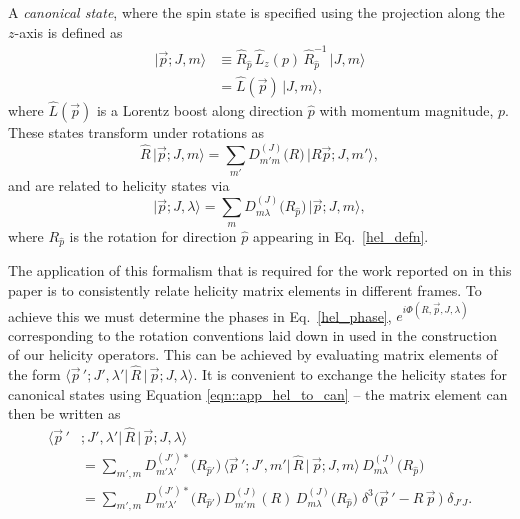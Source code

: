 \documentclass[twocolumn,amsmath,amssymb,prd,10pt,floatfix, 
superscriptaddress,nofootinbib, showpacs, preprintnumbers]{revtex4-1}
\begin{document}
A \emph{canonical state}, where the spin state is specified using the projection along the $z$-axis is defined as 
\begin{align*}
\big| \vec{p}; J,m \big\rangle &\equiv \hat{R}_{\hat{p}}\,  \hat{L}_z(p)\,  \hat{R}_{\hat{p}}^{-1}\, \big| J,m \big\rangle \\
&=  \hat{L}(\vec{p}) \, \big| J,m \big\rangle, 
\end{align*}
where $ \hat{L}(\vec{p})$ is a Lorentz boost along direction $\hat{p}$ with momentum magnitude, $p$. These states transform under rotations as 
\begin{equation*}
\hat{R} \,\big| \vec{p}; J,m \big\rangle = \sum_{m'} D^{(J)}_{m'm}\big(R\big) \, \big| R\vec{p}; J,m' \big\rangle,
\end{equation*}
and are related to helicity states via
\begin{equation}
\big| \vec{p}; J,\lambda \big\rangle  = \sum_{m} D^{(J)}_{m\lambda}\big(R_{\hat{p}}\big) \, \big| \vec{p}; J,m \big\rangle, \label{eqn::app_hel_to_can}
\end{equation}
where $R_{\hat{p}}$ is the rotation for direction $\hat{p}$ appearing in Eq.~\ref{hel_defn}. 



The application of this formalism that is required for the work reported on in this paper is to consistently relate helicity matrix elements in different frames. To achieve this we must determine the phases in Eq.~\ref{hel_phase}, $e^{i \Phi(R, \vec{p}, J, \lambda)}$ corresponding to the rotation conventions laid down in \cite{Thomas:2011rh} used in the construction of our helicity operators. This can be achieved by evaluating matrix elements of the form $\big\langle \vec{p}\,'; J', \lambda' \big| \, \hat{R} \, \big|\,\vec{p}; J,\lambda \big\rangle $. It is convenient to exchange the helicity states for canonical states using Equation \ref{eqn::app_hel_to_can} -- the matrix element can then be written as 
\begin{align*}
\big\langle \vec{p}\,'&; J', \lambda' \big| \, \hat{R} \, \big|\,\vec{p}; J,\lambda \big\rangle  \\ 
&= \sum_{m',m}\! D^{(J')*}_{m' \lambda'}\big(R_{\hat{p}'} \big)\,  \big\langle \vec{p}\,'; J', m' \big| \, \hat{R} \, \big| \,\vec{p}; J,m \big\rangle    \, D^{(J)}_{m\lambda}\big(R_{\hat{p}} \big)
\\
&=\sum_{m',m}\! D^{(J')*}_{m' \lambda'}\big(R_{\hat{p}'} \big) \,  D^{(J)}_{m' m}(R) \,  D^{(J)}_{m\lambda} \big(R_{\hat{p}}\big) \; \delta^3\big(\vec{p}\,' - R\,\vec{p}\, \big) \;\delta_{J'J}.
\end{align*}
\end{document}
